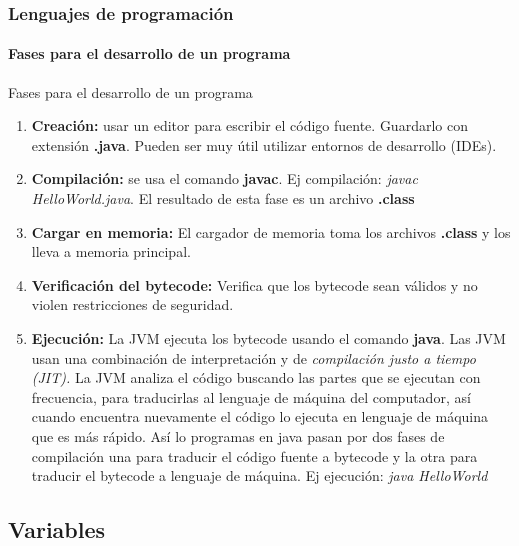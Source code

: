 \documentclass{beamer}
\begin{document}
		\begin{frame}
			\frametitle{Lenguajes de programaci\'on}
			\framesubtitle{Fases para el desarrollo de un programa}

			\begin{exampleblock}{Fases para el desarrollo de un programa}
				{\scriptsize 
				\begin{enumerate}
					\item \textbf{Creaci\'on:} usar un editor para escribir el c\'odigo fuente. Guardarlo con extensi\'on \textbf {.java}. Pueden ser muy \'util utilizar entornos de desarrollo (IDEs).
					\item \textbf{Compilaci\'on:} se usa el comando \textbf {javac}. Ej compilaci\'on: \emph{javac HelloWorld.java}. El resultado de esta fase es un archivo \textbf {.class}
					\item \textbf{Cargar en memoria:} El cargador de memoria toma los archivos \textbf {.class } y los lleva a memoria principal.
					\item \textbf{Verificaci\'on del bytecode:} Verifica que los bytecode sean v\'alidos y no violen restricciones de seguridad.
					\item \textbf{Ejecuci\'on:} La JVM ejecuta los bytecode usando el comando \textbf{java}. Las JVM usan una combinaci\'on de interpretaci\'on y de \emph{compilaci\'on justo a tiempo (JIT).} La JVM analiza el c\'odigo buscando las partes que se ejecutan con frecuencia, para traducirlas al lenguaje de m\'aquina del computador, as\'i cuando encuentra nuevamente el c\'odigo lo ejecuta en lenguaje de m\'aquina que es m\'as r\'apido. As\'i lo programas en java pasan por dos fases de compilaci\'on una para traducir el c\'odigo fuente a bytecode y la otra para traducir el bytecode a lenguaje de m\'aquina. Ej ejecuci\'on: \emph{java HelloWorld}
				\end{enumerate}
				}
			\end{exampleblock}
		\end{frame}

		\subsection{Variables}
\end{document}
